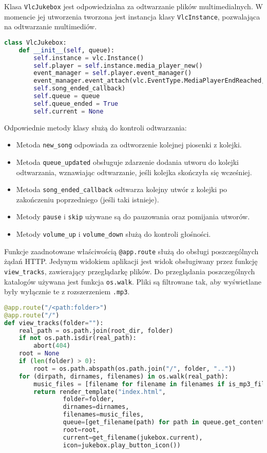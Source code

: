 \documentclass[10pt,a4paper]{article}
\begin{document}
Klasa \texttt{VlcJukebox} jest odpowiedzialna za odtwarzanie plików multimedialnych. W momencie
jej utworzenia tworzona jest instancja klasy \texttt{VlcInstance}, pozwalająca na odtwarzanie
multimediów.

\begin{lstlisting}[language=python,caption=Konstruktor klasy \texttt{VlcInstance}]
class VlcJukebox:
    def __init__(self, queue):
        self.instance = vlc.Instance()
        self.player = self.instance.media_player_new()
        event_manager = self.player.event_manager()
        event_manager.event_attach(vlc.EventType.MediaPlayerEndReached, 
		self.song_ended_callback)
        self.queue = queue
        self.queue_ended = True
        self.current = None
\end{lstlisting}

Odpowiednie metody klasy służą do kontroli odtwarzania:

\begin{itemize}
	\item Metoda \texttt{new\_song} odpowiada za odtworzenie kolejnej piosenki z kolejki.
	\item Metoda \texttt{queue\_updated} obsługuje zdarzenie dodania utworu do kolejki
		odtwarzania, wznawiając odtwarzanie, jeśli kolejka skończyła się wcześniej.
	\item Metoda \texttt{song\_ended\_callback} odtwarza kolejny utwór z kolejki
		po zakończeniu poprzedniego (jeśli taki istnieje).
	\item Metody \texttt{pause} i \texttt{skip} używane są do pauzowania oraz pomijania
		utworów.
	\item Metody \texttt{volume\_up} i \texttt{volume\_down} służą do kontroli głośności.
\end{itemize}

Funkcje zaadnotowane właściwością \texttt{@app.route} służą do obsługi poszczególnych
żądań HTTP. Jedynym widokiem aplikacji jest widok obsługiwany przez funkcję
\texttt{view\_tracks}, zawierający przeglądarkę plików. Do przeglądania poszczególnych
katalogów używana jest funkcja \texttt{os.walk}. Pliki są filtrowane tak, aby wyświetlane były
wyłącznie te z rozszerzeniem \texttt{.mp3}.

\begin{lstlisting}[language=python,caption=Metoda obsługująca przeglądarkę plików]
@app.route("/<path:folder>")
@app.route("/")
def view_tracks(folder=""):
    real_path = os.path.join(root_dir, folder)
    if not os.path.isdir(real_path):
        abort(404)
    root = None
    if (len(folder) > 0):
        root = os.path.abspath(os.path.join("/", folder, ".."))
    for (dirpath, dirnames, filenames) in os.walk(real_path):
        music_files = [filename for filename in filenames if is_mp3_file(filename)]
        return render_template("index.html", 
                folder=folder, 
                dirnames=dirnames, 
                filenames=music_files, 
                queue=[get_filename(path) for path in queue.get_contents()],
                root=root,
                current=get_filename(jukebox.current),
                icon=jukebox.play_button_icon())
\end{lstlisting}
\end{document}
